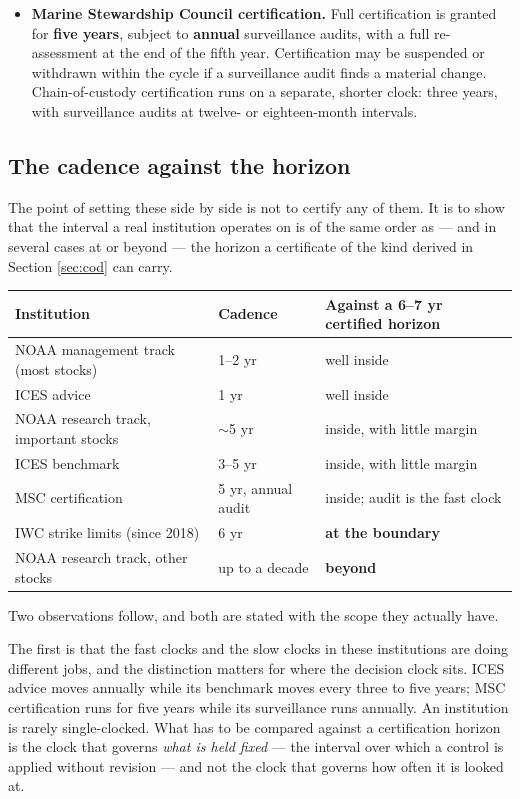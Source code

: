 \begin{itemize}
\item \textbf{Marine Stewardship Council certification.} Full certification is granted for
\textbf{five years}, subject to \textbf{annual} surveillance audits, with a full
re-assessment at the end of the fifth year. Certification may be suspended or withdrawn
within the cycle if a surveillance audit finds a material change. Chain-of-custody
certification runs on a separate, shorter clock: three years, with surveillance audits at
twelve- or eighteen-month intervals.

\end{itemize}

\subsection{The cadence against the horizon}

The point of setting these side by side is not to certify any of them. It is to show that
the interval a real institution operates on is of the same order as --- and in several
cases at or beyond --- the horizon a certificate of the kind derived in Section
\ref{sec:cod} can carry.

\begin{center}
\begin{tabular}{lll}
\hline
Institution & Cadence & Against a 6--7 yr certified horizon \\
\hline
NOAA management track (most stocks) & 1--2 yr & well inside \\
ICES advice & 1 yr & well inside \\
NOAA research track, important stocks & $\sim$5 yr & inside, with little margin \\
ICES benchmark & 3--5 yr & inside, with little margin \\
MSC certification & 5 yr, annual audit & inside; audit is the fast clock \\
IWC strike limits (since 2018) & 6 yr & \textbf{at the boundary} \\
NOAA research track, other stocks & up to a decade & \textbf{beyond} \\
\hline
\end{tabular}
\end{center}

Two observations follow, and both are stated with the scope they actually have.

The first is that the fast clocks and the slow clocks in these institutions are doing
different jobs, and the distinction matters for where the decision clock sits. ICES advice
moves annually while its benchmark moves every three to five years; MSC certification runs
for five years while its surveillance runs annually. An institution is rarely
single-clocked. What has to be compared against a certification horizon is the clock that
governs \emph{what is held fixed} --- the interval over which a control is applied without
revision --- and not the clock that governs how often it is looked at.


